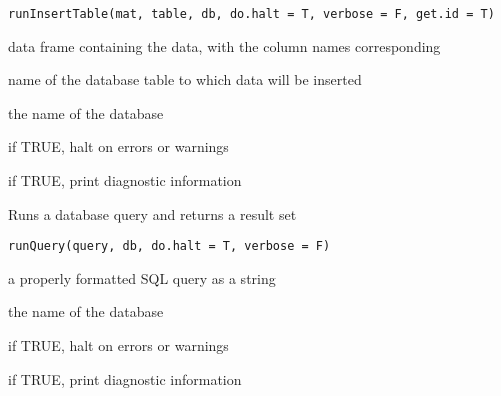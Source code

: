 \documentclass[letterpaper]{book}
\begin{document}
%
\begin{Usage}
\begin{verbatim}
runInsertTable(mat, table, db, do.halt = T, verbose = F, get.id = T)
\end{verbatim}
\end{Usage}
%
\begin{Arguments}
\begin{ldescription}
\item[\code{mat}] data frame containing the data, with the column names corresponding

\item[\code{table}] name of the database table to which data will be inserted

\item[\code{db}] the name of the database

\item[\code{do.halt}] if TRUE, halt on errors or warnings

\item[\code{verbose}] if TRUE, print diagnostic information
\end{ldescription}
\end{Arguments}
%
\begin{Description}\relax
Runs a database query and returns a result set
\end{Description}
%
\begin{Usage}
\begin{verbatim}
runQuery(query, db, do.halt = T, verbose = F)
\end{verbatim}
\end{Usage}
%
\begin{Arguments}
\begin{ldescription}
\item[\code{query}] a properly formatted SQL query as a string

\item[\code{db}] the name of the database

\item[\code{do.halt}] if TRUE, halt on errors or warnings

\item[\code{verbose}] if TRUE, print diagnostic information
\end{ldescription}
\end{Arguments}
\end{document}
